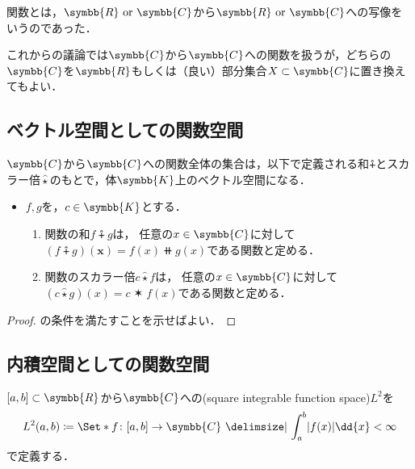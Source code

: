\documentclass{sotsu}
\newcommand{\scaprod}{\mathbin{\star}}
\newcommand{\scaprodvar}{\mathbin{\varstar}}
\begin{document}
関数とは，$\symbb{R} \text{ or } \symbb{C}$から$\symbb{R} \text{ or } \symbb{C}$への写像をいうのであった．

これからの議論では$\symbb{C}$から$\symbb{C}$への関数を扱うが，どちらの$\symbb{C}$を$\symbb{R}$もしくは（良い）部分集合$X \subset \symbb{C}$に置き換えてもよい．

\subsection{ベクトル空間としての関数空間}

\begin{proposition}
    \label{thm:function-space-is-vector-space}
    $\symbb{C}$から$\symbb{C}$への関数全体の集合は，以下で定義される和$\plushat$とスカラー倍$\hat{\scaprod}$のもとで，体$\symbb{K}$上のベクトル空間になる．
    \begin{itemize}
        \item $f, g$を，$c \in \symbb{K}$とする．
        \begin{enumerate}
            \item 関数の和$f \plushat g$は，
                任意の$x \in \symbb{C}$に対して$ ( f \plushat g )(\symbf{x}) = f(x) \doubleplus g(x) $である関数と定める．
            \item 関数のスカラー倍$c \mathbin{\hat{\scaprod}} f$は，
                任意の$x \in \symbb{C}$に対して$ ( c \mathbin{\hat{\scaprod}} g )(x) = c \scaprodvar f(x) $である関数と定める．
        \end{enumerate}
    \end{itemize}
\end{proposition}

\begin{proof}
    の条件を満たすことを示せばよい．
\end{proof}



\subsection{内積空間としての関数空間}

\begin{definition}
    \label{dfn:square-integrable-function-space}
    $[a, b] \subset \symbb{R}$から$\symbb{C}$への(square integrable function space)$L^2$を
    \begin{equation*}
        L^2 (a, b) \coloneq \Set*{ f \colon [a, b] \to \symbb{C}  \given  \int_a^b \abs{f(x)} \dd{x} < \infty }
    \end{equation*}
    で定義する．
\end{definition}
\end{document}
